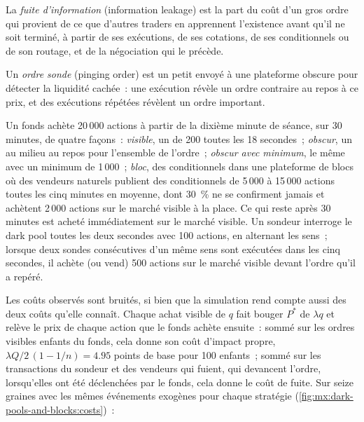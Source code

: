 \begin{definition}\label{def:mx:dark-pools-and-blocks:leakage}
La \emph{fuite d'information} (information leakage) est la part du coût d'un gros ordre qui provient de ce que d'autres traders en apprennent l'existence avant qu'il ne soit
terminé, à partir de ses exécutions, de ses cotations, de ses conditionnels ou de son routage, et de la négociation qui le précède.
\end{definition}

\begin{definition}\label{def:mx:dark-pools-and-blocks:ping}
Un \emph{ordre sonde} (pinging order) est un petit  envoyé à une plateforme obscure pour détecter la liquidité cachée~: une exécution révèle un
ordre contraire au repos à ce prix, et des exécutions répétées révèlent un ordre important.
\end{definition}

Un fonds achète 20\,000 actions à partir de la dixième minute de séance, sur 30 minutes, de quatre façons~: \emph{visible}, un  de 200 toutes les 18 secondes~;
\emph{obscur}, un  au milieu au repos pour l'ensemble de l'ordre~; \emph{obscur avec minimum}, le même  avec un minimum de 1\,000~; \emph{bloc}, des conditionnels
dans une plateforme de blocs où des vendeurs naturels publient des conditionnels de 5\,000 à 15\,000 actions toutes les cinq minutes en moyenne, dont 30~\% ne se confirment jamais et achètent
2\,000 actions sur le marché visible à la place. Ce qui reste après 30 minutes est acheté immédiatement sur le marché visible. Un sondeur interroge le dark pool toutes les deux secondes avec 100 actions,
en alternant les sens~; lorsque deux sondes consécutives d'un même sens sont exécutées dans les cinq secondes, il achète (ou vend) 500 actions sur le marché visible devant l'ordre qu'il a repéré.

\label{lst:mx:dark-pools-and-blocks:ping}

Les coûts observés sont bruités, si bien que la simulation rend compte aussi des deux coûts qu'elle connaît. Chaque achat visible de $q$ fait bouger $P^\ast$ de $\lambda q$ et relève le
prix de chaque action que le fonds achète ensuite~: sommé sur les ordres visibles enfants du fonds, cela donne son coût d'impact propre, $\lambda Q/2\,(1-1/n)=4.95$ points
de base pour 100 enfants~; sommé sur les transactions du sondeur et des vendeurs qui fuient, qui devancent l'ordre, lorsqu'elles ont été déclenchées par le fonds, cela donne le coût de fuite.
Sur seize graines avec les mêmes événements exogènes pour chaque stratégie (\cref{fig:mx:dark-pools-and-blocks:costs})~:

